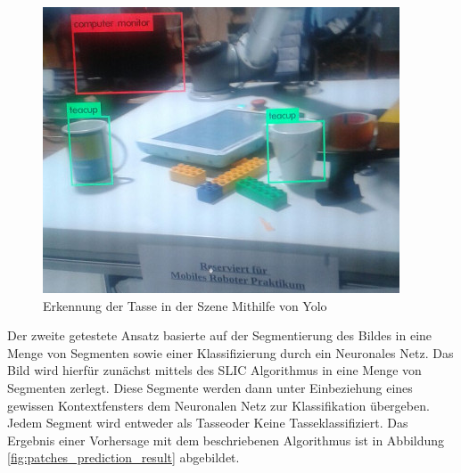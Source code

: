 \begin{figure}
\centering
\includegraphics[scale=0.5]{./images/yolo.jpeg}
\caption{Erkennung der Tasse in der Szene Mithilfe von Yolo}
\end{figure}

Der zweite getestete Ansatz basierte auf der Segmentierung des Bildes in eine Menge von Segmenten sowie einer Klassifizierung durch ein Neuronales Netz. Das Bild wird hierfür zunächst mittels des SLIC Algorithmus in eine Menge von Segmenten zerlegt. Diese Segmente werden dann unter Einbeziehung eines gewissen Kontextfensters dem Neuronalen Netz zur Klassifikation übergeben. Jedem Segment wird entweder als \glqq Tasse\grqq oder \glqq Keine Tasse\grqq klassifiziert. Das Ergebnis einer Vorhersage mit dem beschriebenen Algorithmus ist in Abbildung \ref{fig:patches_prediction_result} abgebildet.

